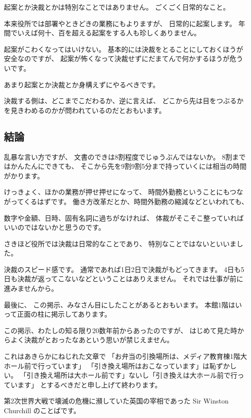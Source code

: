 \documentclass[uplatex,jis2004,dvipdfmx,12pt]{jsarticle}
\begin{document}
起案とか決裁とかは特別なことではありません。
ごくごく日常的なこと。

本来役所では部署やときどきの業務にもよりますが、
日常的に起案します。
年間でいえば何十、百を超える起案をする人も珍しくありません。

起案がこわくなってはいけない。
基本的には決裁をとることにしておくほうが安全なのですが、
起案が怖くなって決裁せずにだまてんで何かするほうが危ういです。

あまり起案とか決裁とか身構えずにやるべきです。

決裁する側は、どこまでこだわるか、逆に言えば、
どこから先は目をつぶるかを見きわめるのかが問われているのだとおもいます。

\subsection{結論}
乱暴な言い方ですが、
文書のできは8割程度でじゅうぶんではないか。
8割まではかんたんにできても、
そこから先を9割9割5分まで持っていくには相当の時間がかります。

けっきょく、ほかの業務が押せ押せになって、
時間外勤務ということにもつながってくるはずです。
働き方改革だとか、時間外勤務の縮減などといわれても、


数字や金額、日時、固有名詞に過ちがなければ、
体裁がそこそこ整っていればいいのではないかと思うのです。






さきほど役所では決裁は日常的なことであり、
特別なことではないといいました。

決裁のスピード感です。
通常であれば1日2日で決裁がもどってきます。
4日も5日も決裁が返ってこないなどということはありえません。
それでは仕事が前に進みませんから。


最後に、
この掲示、みなさん目にしたことがあるとおもいます。
本館1階はいって正面の柱に掲示してあります。

この掲示、わたしの知る限り20数年前からあったのですが、
はじめて見た時からよく決裁がとおったなあという思いが禁じえません。

これはあきらかにねじれた文章で
「お弁当の引換場所は、メディア教育棟1階大ホール前で行っています」
「引き換え場所はおこなっています」は恥ずかしい。
「引き換え場所は大ホール前です」ないし「引き換えは大ホール前で行っています」
とするべきだと申し上げて終わります。



第2次世界大戦で壊滅の危機に瀕していた英国の宰相であった Sir Winston Churchill
のことばです。
\end{document}
